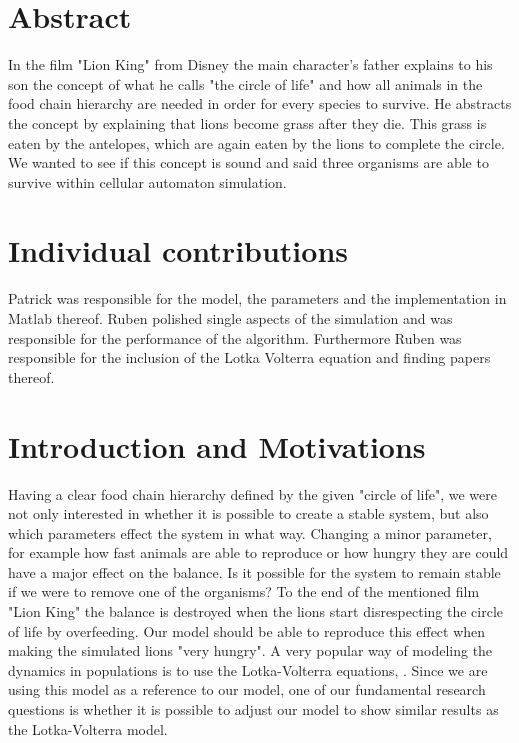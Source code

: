 \documentclass[11pt]{article}
\begin{document}



\section{Abstract}
In the film "Lion King" from Disney the main character's father explains to his son the concept of what he calls "the circle of life" and how all animals in the food chain hierarchy are needed in order for every species to survive. He abstracts the concept by explaining that lions become grass after they die. This grass is eaten by the antelopes, which are again eaten by the lions to complete the circle. We wanted to see if this concept is sound and said three organisms are able to survive within cellular automaton simulation.

\section{Individual contributions}
Patrick was responsible for the model, the parameters and the implementation in Matlab thereof. Ruben polished single aspects of the simulation and was responsible for the performance of the algorithm. Furthermore Ruben was responsible for the inclusion of the Lotka Volterra equation and finding papers thereof.

\section{Introduction and Motivations}
Having a clear food chain hierarchy defined by the given "circle of life", we were not only interested in whether it is possible to create a stable system, but also which parameters effect the system in what way. Changing a minor parameter, for example how fast animals are able to reproduce or how hungry they are could have a major effect on the balance. Is it possible for the system to remain stable if we were to remove one of the organisms? To the end of the mentioned film "Lion King" the balance is destroyed when the lions start disrespecting the circle of life by overfeeding. Our model should be able to reproduce this effect when making the simulated lions "very hungry".
A very popular way of modeling the dynamics in populations is to use the Lotka-Volterra equations, \cite{lotkaVolterra}. Since we are using this model as a reference to our model, one of our fundamental research questions is whether it is possible to adjust our model to show similar results as the Lotka-Volterra model.
\end{document}
